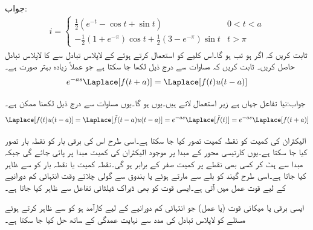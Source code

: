 جواب:
\begin{align*}
i=
\begin{cases}
\tfrac{1}{2}(e^{-t}-\cos t+\sin t) & 0<t<a\\
-\tfrac{1}{2}(1+e^{-\pi})\cos t+\tfrac{1}{2}(3-e^{-\pi})\sin t& t>\pi
\end{cases}
\end{align*}
ثابت کریں کہ اگر  ہو تب  ہو گا۔اس کلیے کو استعمال کرتے ہوئے  کے لاپلاس تبادل سے  کا لاپلاس تبادل حاصل کریں۔
ثابت کریں کہ مساوات  سے درج ذیل لکھا جا سکتا ہے جو عملاً زیادہ بہتر صورت ہے۔
\begin{align}
e^{-as}\Laplace[f(t+a)]=\Laplace[f(t)u(t-a)]
\end{align}

جواب:نیا تفاعل  جہاں  ہے زیر استعمال لاتے ہیں۔یوں  ہو گا۔یوں مساوات  سے درج ذیل لکھنا ممکن ہے۔
\begin{align*}
\Laplace[f(t)u(t-a)]=\Laplace[\tilde{f}(t-a)u(t-a)]=e^{-as}\Laplace[\tilde{f}(t)]=e^{-as}\Laplace[f(t+a)]
\end{align*}


الیکٹران کی کمیت کو نقطہ کمیت تصور کیا جا سکتا ہے۔اسی طرح اس کی برقی بار کو نقطہ بار تصور کیا جا سکتا ہے۔یوں کارتیسی محور کے مبدا پر موجود الیکٹران کی کمیت مبدا پر پائی جائے گی جبکہ مبدا سے ہٹ کر کسی بھی نقطے پر کمیت صفر کے برابر ہو گی۔نقطہ کمیت یا نقطہ بار کو  سے ظاہر کیا جاتا ہے۔اسی طرح گیند کو بلے سے مارتے ہوئے یا بندوق سے گولی چلاتے وقت  انتہائی کم دورانیے کے لیے قوت عمل میں آتی ہے۔ایسی قوت کو بھی ڈیراک ڈیلٹائی تفاعل سے ظاہر کیا جاتا ہے۔

ایسی برقی یا میکانی قوت (یا عمل) جو انتہائی کم دورانیے کے لیے کارآمد ہو کو  سے ظاہر کرتے ہوئے  مسئلے کو لاپلاس تبادل کی مدد سے نہایت عمدگی کے ساتھ حل کیا جا سکتا ہے۔

